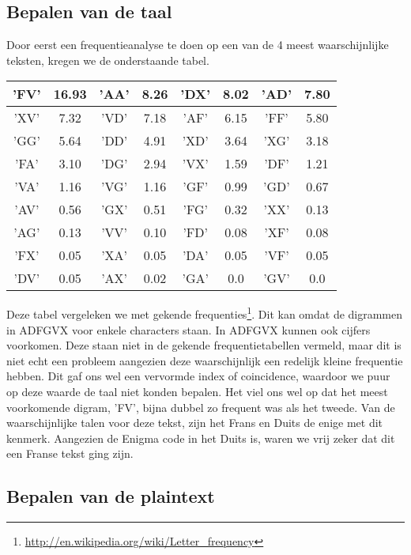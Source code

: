 \subsection{Bepalen van de taal}
Door eerst een frequentieanalyse te doen op een van de 4 meest waarschijnlijke teksten, kregen we de onderstaande tabel.
\begin{center}
\begin{tabular}{|c|c|c|c|c|c|c|c|}
\hline
'FV'& 16.93 &
'AA'& 8.26 &
'DX'& 8.02 &
'AD'& 7.80\\ \hline
'XV'& 7.32 &
'VD'& 7.18 &
'AF'& 6.15 &
'FF'& 5.80\\ \hline
'GG'& 5.64 &
'DD'& 4.91 &
'XD'& 3.64 &
'XG'& 3.18\\ \hline
'FA'& 3.10 &
'DG'& 2.94 &
'VX'& 1.59 &
'DF'& 1.21\\ \hline
'VA'& 1.16 &
'VG'& 1.16 &
'GF'& 0.99 &
'GD'& 0.67\\ \hline
'AV'& 0.56 &
'GX'& 0.51 &
'FG'& 0.32 &
'XX'& 0.13\\ \hline
'AG'& 0.13 &
'VV'& 0.10 &
'FD'& 0.08 &
'XF'& 0.08\\ \hline
'FX'& 0.05 &
'XA'& 0.05 &
'DA'& 0.05 &
'VF'& 0.05\\ \hline
'DV'& 0.05 &
'AX'& 0.02 &
'GA'& 0.0 &
'GV'& 0.0\\ \hline
\end{tabular}

\end{center}

Deze tabel vergeleken we met gekende frequenties\footnote{\url{http://en.wikipedia.org/wiki/Letter_frequency}}. Dit kan omdat de digrammen in ADFGVX voor enkele characters staan. In ADFGVX kunnen ook cijfers voorkomen. Deze staan niet in de gekende frequentietabellen vermeld, maar dit is niet echt een probleem aangezien deze waarschijnlijk een redelijk kleine frequentie hebben. Dit gaf ons wel een vervormde index of coincidence, waardoor we puur op deze waarde de taal niet konden bepalen. Het viel ons wel op dat het meest voorkomende digram, 'FV', bijna dubbel zo frequent was als het tweede. Van de waarschijnlijke talen voor deze tekst, zijn het Frans en Duits de enige met dit kenmerk. Aangezien de Enigma code in het Duits is, waren we vrij zeker dat dit een Franse tekst ging zijn.

\subsection{Bepalen van de plaintext}

